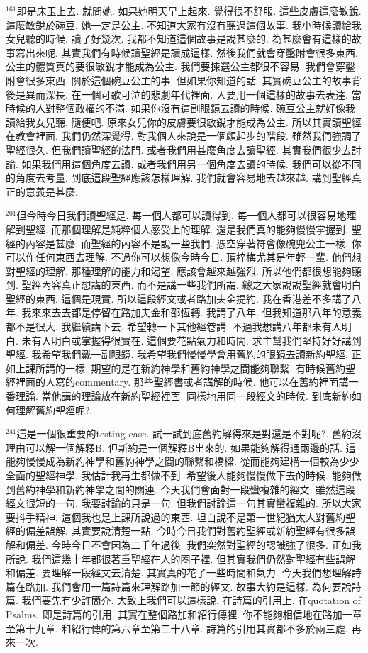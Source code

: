 \documentclass{book}
\begin{document}
$^{161}$即是床玉上去.
就問她.
如果她明天早上起來.
覺得很不舒服.
這些皮膚這麼敏銳.
這麼敏銳於碗豆.
她一定是公主.
不知道大家有沒有聽過這個故事.
我小時候讀給我女兒聽的時候.
讀了好幾次.
我都不知道這個故事是說甚麼的.
為甚麼會有這樣的故事寫出來呢.
其實我們有時候讀聖經是讀成這樣.
然後我們就會穿鑿附會很多東西.
公主的體質真的要很敏銳才能成為公主.
我們要揀選公主都很不容易.
我們會穿鑿附會很多東西.
關於這個碗豆公主的事.
但如果你知道的話.
其實碗豆公主的故事背後是異而深長.
在一個可歌可泣的悲劇年代裡面.
人要用一個這樣的故事去表達.
當時候的人對整個政權的不滿.
如果你沒有這副眼鏡去讀的時候.
碗豆公主就好像我讀給我女兒聽.
隨便吧.
原來女兒你的皮膚要很敏銳才能成為公主.
所以其實讀聖經在教會裡面.
我們仍然深覺得.
對我個人來說是一個頗起步的階段.
雖然我們強調了聖經很久.
但我們讀聖經的法門.
或者我們用甚麼角度去讀聖經.
其實我們很少去討論.
如果我們用這個角度去讀.
或者我們用另一個角度去讀的時候.
我們可以從不同的角度去考量.
到底這段聖經應該怎樣理解.
我們就會容易地去越來越.
講到聖經真正的意義是甚麼.

$^{201}$但今時今日我們讀聖經是.
每一個人都可以讀得到.
每一個人都可以很容易地理解到聖經.
而那個理解是純粹個人感受上的理解.
還是我們真的能夠慢慢掌握到.
聖經的內容是甚麼.
而聖經的內容不是說一些我們.
憑空穿著符會像碗兜公主一樣.
你可以作任何東西去理解.
不過你可以想像今時今日.
頂梓梅尤其是年輕一輩.
他們想對聖經的理解.
那種理解的能力和渴望.
應該會越來越強烈.
所以他們都很想能夠聽到.
聖經內容真正想講的東西.
而不是講一些我們所謂.
總之大家說說聖經就會明白聖經的東西.
這個是現實.
所以這段經文或者路加夫金提約.
我在香港差不多講了八年.
我來來去去都是停留在路加夫金和邵恆轉.
我講了八年.
但我知道那八年的意義都不是很大.
我繼續講下去.
希望轉一下其他經卷講.
不過我想講八年都未有人明白.
未有人明白或掌握得很實在.
這個要花點氣力和時間.
求主幫我們堅持好好講到聖經.
我希望我們戴一副眼鏡.
我希望我們慢慢學會用舊約的眼鏡去讀新約聖經.
正如上課所講的一樣.
期望的是在新約神學和舊約神學之間能夠聯繫.
有時候舊約聖經裡面的人寫的commentary.
那些聖經書或者講解的時候.
他可以在舊約裡面講一番理論.
當他講的理論放在新約聖經裡面.
同樣地用同一段經文的時候.
到底新約如何理解舊約聖經呢?.

$^{241}$這是一個很重要的testing case.
試一試到底舊約解得來是對還是不對呢?.
舊約沒理由可以解一個解釋B.
但新約是一個解釋B出來的.
如果能夠解得通兩邊的話.
這能夠慢慢成為新約神學和舊約神學之間的聯繫和橋樑.
從而能夠建構一個較為少少全面的聖經神學.
我估計我再生都做不到.
希望後人能夠慢慢做下去的時候.
能夠做到舊約神學和新約神學之間的關連.
今天我們會面對一段蠻複雜的經文.
雖然這段經文很短的一句.
我要討論的只是一句.
但我們討論這一句其實蠻複雜的.
所以大家要抖手精神.
這個我也是上課所說過的東西.
坦白說不是第一世紀猶太人對舊約聖經的偏差誤解.
其實要說清楚一點.
今時今日我們對舊約聖經或新約聖經有很多誤解和偏差.
今時今日不會因為二千年過後.
我們突然對聖經的認識強了很多.
正如我所說.
我們這幾十年都很著重聖經在人的圈子裡.
但其實我們仍然對聖經有些誤解和偏差.
要理解一段經文去清楚.
其實真的花了一些時間和氣力.
今天我們想理解詩篇在路加.
我們會用一篇詩篇來理解路加一節的經文.
故事大約是這樣.
為何要說詩篇.
我們要先有少許簡介.
大致上我們可以這樣說.
在詩篇的引用上.
在quotation of Psalms.
即是詩篇的引用.
其實在整個路加和紹行傳裡.
你不能夠相信地在路加一章至第十九章.
和紹行傳的第六章至第二十八章.
詩篇的引用其實都不多於兩三處.
再來一次.
\end{document}
